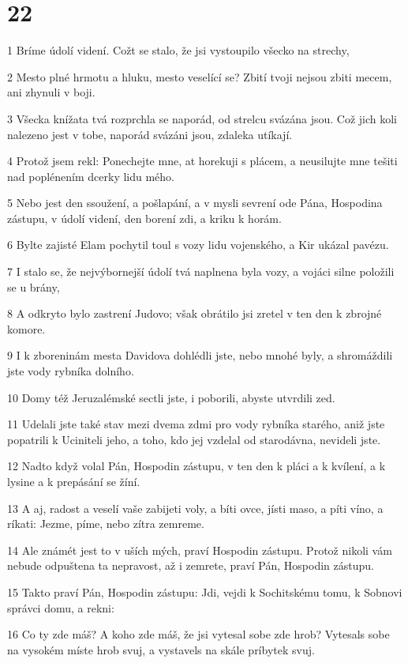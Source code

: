 \chapter{22}

\par 1 Bríme údolí videní. Cožt se stalo, že jsi vystoupilo všecko na strechy,
\par 2 Mesto plné hrmotu a hluku, mesto veselící se? Zbití tvoji nejsou zbiti mecem, ani zhynuli v boji.
\par 3 Všecka knížata tvá rozprchla se naporád, od strelcu svázána jsou. Což jich koli nalezeno jest v tobe, naporád svázáni jsou, zdaleka utíkají.
\par 4 Protož jsem rekl: Ponechejte mne, at horekuji s plácem, a neusilujte mne tešiti nad poplénením dcerky lidu mého.
\par 5 Nebo jest den ssoužení, a pošlapání, a v mysli sevrení ode Pána, Hospodina zástupu, v údolí videní, den borení zdi, a kriku k horám.
\par 6 Bylte zajisté Elam pochytil toul s vozy lidu vojenského, a Kir ukázal pavézu.
\par 7 I stalo se, že nejvýbornejší údolí tvá naplnena byla vozy, a vojáci silne položili se u brány,
\par 8 A odkryto bylo zastrení Judovo; však obrátilo jsi zretel v ten den k zbrojné komore.
\par 9 I k zboreninám mesta Davidova dohlédli jste, nebo mnohé byly, a shromáždili jste vody rybníka dolního.
\par 10 Domy též Jeruzalémské sectli jste, i poborili, abyste utvrdili zed.
\par 11 Udelali jste také stav mezi dvema zdmi pro vody rybníka starého, aniž jste popatrili k Uciniteli jeho, a toho, kdo jej vzdelal od starodávna, nevideli jste.
\par 12 Nadto když volal Pán, Hospodin zástupu, v ten den k pláci a k kvílení, a k lysine a k prepásání se žíní.
\par 13 A aj, radost a veselí vaše zabijeti voly, a bíti ovce, jísti maso, a píti víno, a ríkati: Jezme, píme, nebo zítra zemreme.
\par 14 Ale známét jest to v uších mých, praví Hospodin zástupu. Protož nikoli vám nebude odpuštena ta nepravost, až i zemrete, praví Pán, Hospodin zástupu.
\par 15 Takto praví Pán, Hospodin zástupu: Jdi, vejdi k Sochitskému tomu, k Sobnovi správci domu, a rekni:
\par 16 Co ty zde máš? A koho zde máš, že jsi vytesal sobe zde hrob? Vytesals sobe na vysokém míste hrob svuj, a vystavels na skále príbytek svuj.
